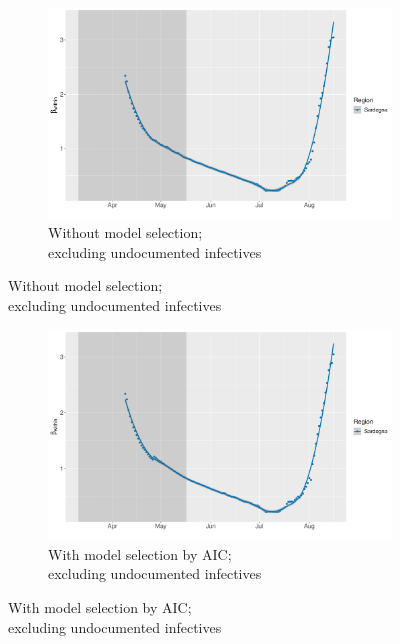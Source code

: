 \documentclass[12pt]{article}
\begin{document}
\begin{appendices}
		\begin{figure}[H]
    	    \centering
    	    \begin{subfigure}{\textwidth}
    	      \centering
    	      \includegraphics[width=0.94\linewidth]{output/model_within_lag14_betawithin_Isole_rollingwindow30.pdf}
    	      \caption{Without model selection; \\ excluding undocumented infectives}
    	      \label{fig:beta_within_over_time_isole_lowsample_regular}
    	    \end{subfigure}\newline
        \end{figure}
        \begin{figure}[H]\ContinuedFloat
    	    \begin{subfigure}{\textwidth}
    	      \centering
    	      \includegraphics[width=0.94\linewidth]{output/model_within_lag14_betawithin_Isole_aic_rollingwindow30.pdf}
    	      \caption{With model selection by AIC; \\ excluding undocumented infectives}
    	      \label{fig:beta_within_over_time_isole_lowsample_aic}

\end{subfigure}
\end{figure}
\end{appendices}
\end{document}
